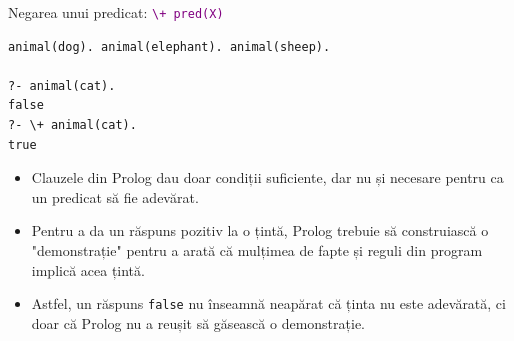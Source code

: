 \documentclass[xcolor=x11names,compress,10pt]{beamer}
\begin{document}
\begin{frame}[fragile]{Negarea unui predicat: \textcolor{purple}{\texttt{\textbackslash + pred(X)}}}
\vspace*{0.3cm}
\begin{example}
\begin{verbatim}
animal(dog). animal(elephant). animal(sheep).

?- animal(cat).
false
?- \+ animal(cat).
true
\end{verbatim}
\end{example}
\pause

\begin{itemize}
	\item Clauzele din Prolog dau doar condiții suficiente, dar nu și necesare pentru ca un predicat să fie adevărat.
	\item Pentru a da un răspuns pozitiv la o țintă, Prolog trebuie să construiască o "demonstrație" pentru a arată că mulțimea de fapte și reguli din program implică acea țintă.
	\item Astfel, un răspuns \alert{\texttt{false}} nu înseamnă neapărat că ținta nu este adevărată, ci doar că \alert{Prolog nu a reușit să găsească o demonstrație}.	
\end{itemize}
\end{frame}
\end{document}
